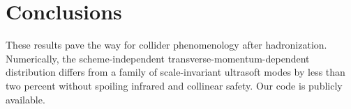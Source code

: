 \section{Conclusions}\label{sec:conclusions}

These results pave the way for collider phenomenology after
hadronization. Numerically, the scheme-independent
transverse-momentum-dependent distribution differs from a family of
scale-invariant ultrasoft modes by less than two percent without
spoiling infrared and collinear safety. Our code is publicly available.

